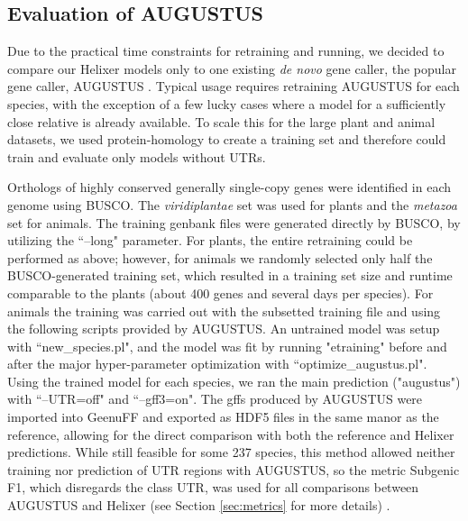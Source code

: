 \documentclass{bioinfo}
\begin{document}
\begin{methods}
\subsection{Evaluation of AUGUSTUS} 
\label{sec:augustus}
Due to the practical time constraints for retraining and running, we decided to compare our Helixer
models only to one existing {\it de novo} gene caller, the popular gene caller, AUGUSTUS \citep{stanke2003gene}.
Typical usage requires retraining AUGUSTUS for each species, with the exception of a
few lucky cases where a model for a sufficiently close relative is already available. To scale this for 
the large plant and animal datasets, we used protein-homology to create a training set and
therefore could train and evaluate only models without UTRs. 

Orthologs of highly conserved generally single-copy genes were identified in each genome using
BUSCO. The {\it viridiplantae} set was used for plants and the {\it metazoa} set for animals.
The training genbank files were generated directly by BUSCO, by utilizing the ``--long"  %
parameter. For plants, the entire retraining could be performed as above; however, for animals
we randomly selected only half the BUSCO-generated training set, which resulted in a training set 
size and runtime comparable to the plants (about 400 genes and several days per species). For animals
the training was carried out with the subsetted training file and using the following scripts provided
by AUGUSTUS. An untrained model was setup with ``new\_species.pl", and the model was fit by running
"etraining" before and after the major hyper-parameter optimization with ``optimize\_augustus.pl".
Using the trained model for each species, we ran the main prediction ("augustus") with ``--UTR=off"
and ``--gff3=on". The gffs produced by AUGUSTUS were imported into GeenuFF and exported as HDF5
files in the same manor as the reference, allowing for the direct comparison with both the reference and 
Helixer predictions. While still feasible for some 237 species, this method allowed neither training
nor prediction of UTR regions with AUGUSTUS, so the metric Subgenic F1, which disregards the class UTR,
was used for all comparisons between AUGUSTUS and Helixer (see Section \ref{sec:metrics} for more details) .


\end{methods}
\end{document}
